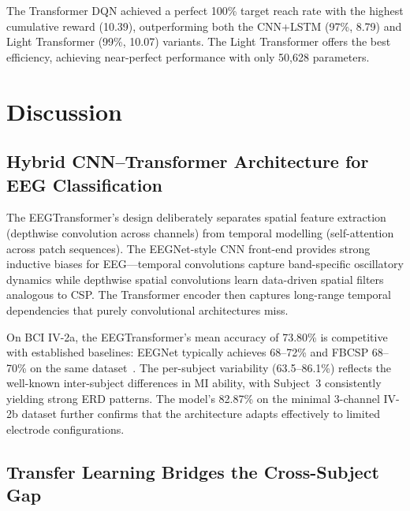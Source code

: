 \documentclass[12pt, a4paper]{article}
\begin{document}
The Transformer DQN achieved a perfect 100\% target reach rate with the highest cumulative reward (10.39), outperforming both the CNN+LSTM (97\%, 8.79) and Light Transformer (99\%, 10.07) variants. The Light Transformer offers the best efficiency, achieving near-perfect performance with only 50,628 parameters.

\section{Discussion}

\subsection{Hybrid CNN--Transformer Architecture for EEG Classification}

The EEGTransformer's design deliberately separates spatial feature extraction (depthwise convolution across channels) from temporal modelling (self-attention across patch sequences). The EEGNet-style CNN front-end provides strong inductive biases for EEG---temporal convolutions capture band-specific oscillatory dynamics while depthwise spatial convolutions learn data-driven spatial filters analogous to CSP. The Transformer encoder then captures long-range temporal dependencies that purely convolutional architectures miss.

On BCI IV-2a, the EEGTransformer's mean accuracy of 73.80\% is competitive with established baselines: EEGNet typically achieves 68--72\% and FBCSP 68--70\% on the same dataset~\cite{hameed2025enhancing}. The per-subject variability (63.5--86.1\%) reflects the well-known inter-subject differences in MI ability, with Subject~3 consistently yielding strong ERD patterns. The model's 82.87\% on the minimal 3-channel IV-2b dataset further confirms that the architecture adapts effectively to limited electrode configurations.

\subsection{Transfer Learning Bridges the Cross-Subject Gap}
\end{document}
